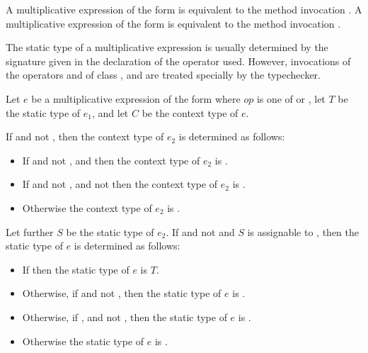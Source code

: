 \documentclass[makeidx]{article}
\begin{document}
{\LMHash{}%
A multiplicative expression of the form 
is equivalent to the method invocation .
A multiplicative expression of the form 
is equivalent to the method invocation .

\LMHash{}%
The static type of a multiplicative expression is usually determined
by the signature given in the declaration of the operator used.
However, invocations of the operators \code{*} and \code{\%} of
class ,  and 
are treated specially by the typechecker.

\LMHash{}%
Let $e$ be a multiplicative expression of the form 
where $op$ is one of \code{*} or \code{\%},
let $T$ be the static type of $e_1$,
and let $C$ be the context type of $e$.

If  and not , then
the context type of $e_2$ is determined as follows:
\begin{itemize}
  \item{} If  and not ,
      and 
      then the context type of $e_2$ is .
  \item{} If  and not ,
      and not 
     then the context type of $e_2$ is .
  \item{} Otherwise the context type of $e_2$ is .
\end{itemize}
Let further $S$ be the static type of $e_2$.
If  and not 
and $S$ is assignable to ,
then the static type of $e$ is determined as follows:
\begin{itemize}
  \item{} If 
    then the static type of $e$ is $T$.
  \item{} Otherwise, if 
    and not ,
    then the static type of $e$ is .
  \item{} Otherwise, if ,
     and not ,
    then the static type of $e$ is .
  \item{} Otherwise the static type of $e$ is .
\end{itemize}


}
\end{document}
